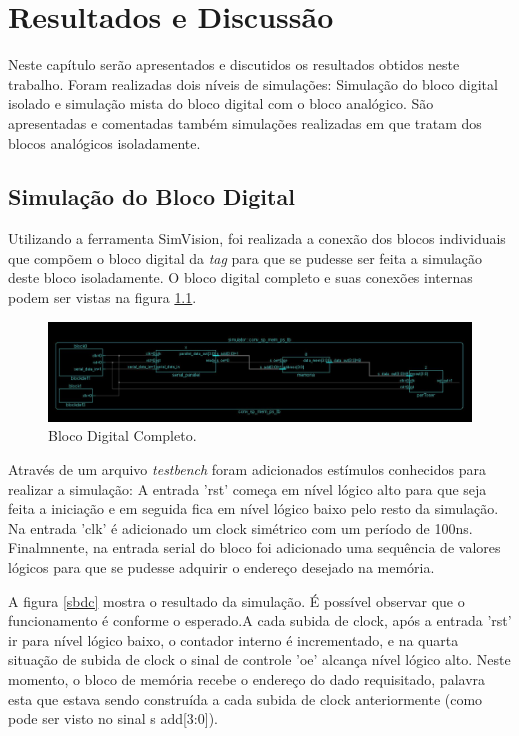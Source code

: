 \chapter{Resultados e Discussão}

Neste capítulo serão apresentados e discutidos os resultados obtidos neste trabalho. Foram realizadas dois níveis de simulações: Simulação do bloco digital isolado e simulação mista do bloco digital com o bloco analógico. São apresentadas e comentadas também simulações realizadas em \cite{Marlon} que tratam dos blocos analógicos isoladamente.

\section{Simulação do Bloco Digital}

Utilizando a ferramenta SimVision, foi realizada a conexão dos blocos individuais que compõem o bloco digital da \textit{tag} para que se pudesse ser feita a simulação deste bloco isoladamente. O bloco digital completo e suas conexões internas podem ser vistas na figura \ref{bdc}.

\begin{figure}[ht!]
  \centering
  \includegraphics[width=\textwidth]{figuras/blocosdigitais.JPG}
  \caption{Bloco Digital Completo.}
  \label{bdc}
\end{figure}

Através de um arquivo \textit{testbench} foram adicionados estímulos conhecidos para realizar a simulação: A entrada 'rst' começa em nível lógico alto para que seja feita a iniciação e em seguida fica em nível lógico baixo pelo resto da simulação. Na entrada 'clk' é adicionado um clock simétrico com um período de 100ns. Finalmnente, na entrada serial do bloco foi adicionado uma sequência de valores lógicos para que se pudesse adquirir o endereço desejado na memória.

A figura \ref{sbdc} mostra o resultado da simulação. É possível observar que o funcionamento é conforme o esperado.A cada subida de clock, após a entrada 'rst' ir para nível lógico baixo, o contador interno é incrementado, e na quarta situação de subida de clock o sinal de controle 'oe' alcança nível lógico alto. Neste momento, o bloco de memória recebe o endereço do dado requisitado, palavra esta que estava sendo construída a cada subida de clock anteriormente (como pode ser visto no sinal s add[3:0]).

